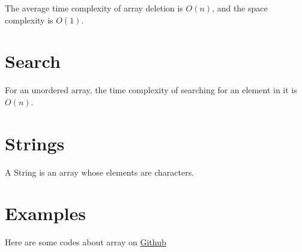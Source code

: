 \message{ !name(algorithms.tex)}\documentclass[a4paper,10pt]{book}
\begin{document}
The average time complexity of array deletion is $O(n)$, and the space complexity is $O(1)$.


\section{Search}

For an unordered array, the time complexity of searching for an element in it is $O(n)$.



\section{Strings}

A String is an array whose elements are characters.


\section{Examples}

Here are some codes about array on \href{https://github.com/mingmingli916/algorithms/tree/main/array}{Github}






\end{document}
